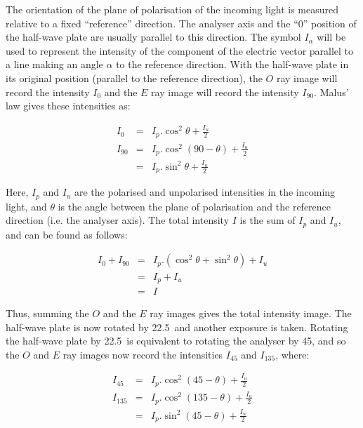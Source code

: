 The orientation of the plane of polarisation of the incoming light is 
measured relative to a fixed ``reference'' direction. The analyser axis
and the ``0\dgs'' position of the half-wave plate are usually
parallel to this direction. The symbol $I_{\alpha}$ will be used to
represent the intensity of the component of the electric vector parallel
to a line making an angle $\alpha$ to the reference direction. With the
half-wave plate in its original position (parallel to the reference
direction), the $O$ ray image will record the intensity $I_{0}$ and the
$E$ ray image will record the intensity $I_{90}$. Malus' law gives these
intensities as:

\begin{eqnarray*}
  I_{0} & = & I_{p}.\cos^{2}\theta + \frac{I_{u}}{2} \\
 I_{90} & = & I_{p}.\cos^{2}(90 - \theta) + \frac{I_{u}}{2} \\
        & = & I_{p}.\sin^{2}\theta + \frac{I_{u}}{2}
\end{eqnarray*}

Here, $I_{p}$ and $I_{u}$ are the polarised and unpolarised intensities
in the incoming light, and $\theta$ is the angle between the plane of
polarisation and the reference direction (i.e. the analyser axis). The
total intensity $I$ is the sum of $I_{p}$ and $I_{u}$, and can be found
as follows:

\begin{eqnarray*}
  I_{0} + I_{90} & = & I_{p}.(\cos^{2}\theta + \sin^{2}\theta) + I_{u} \\
                 & = & I_{p} + I_{u} \\
                 & = & I
\end{eqnarray*}

Thus, summing the $O$ and the $E$ ray images gives the total intensity
image. The half-wave plate is now rotated by 22.5\dgs\ and another
exposure is taken. Rotating the half-wave plate by 22.5\dgs\ is
equivalent to rotating the analyser by 45\dgs, and so the $O$ and
$E$ ray images now record the intensities $I_{45}$ and $I_{135}$, where:

\begin{eqnarray*}
  I_{45} & = & I_{p}.\cos^{2}(45 - \theta) + \frac{I_{u}}{2} \\
 I_{135} & = & I_{p}.\cos^{2}(135 - \theta) + \frac{I_{u}}{2} \\
         & = & I_{p}.\sin^{2}(45 - \theta) + \frac{I_{u}}{2}
\end{eqnarray*}

